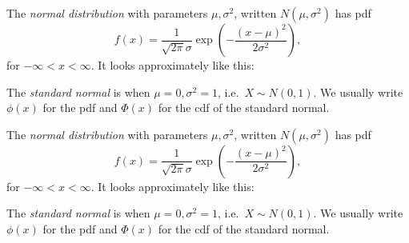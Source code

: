 \begin{note}
  \begin{field}
    \begin{defi}
      The \emph{normal distribution} with parameters $\mu, \sigma^2$, written $N(\mu, \sigma^2)$ has pdf
      \[
        f(x) = \frac{1}{\sqrt{2 \pi}\sigma}\exp\left(-\frac{(x - \mu)^2}{2\sigma^2}\right),
      \]
      for $-\infty < x < \infty$.
      It looks approximately like this:
      \begin{center}
      \end{center}
      The \emph{standard normal} is when $\mu = 0, \sigma^2 = 1$, i.e.\ $X\sim N(0, 1)$.
      We usually write $\phi(x)$ for the pdf and $\Phi(x)$ for the cdf of the standard normal.
    \end{defi}
  \end{field}
  \begin{field}
    \begin{defi}
      The \emph{normal distribution} with parameters $\mu, \sigma^2$, written $N(\mu, \sigma^2)$ has pdf
      \[
        f(x) = \frac{1}{\sqrt{2 \pi}\sigma}\exp\left(-\frac{(x - \mu)^2}{2\sigma^2}\right),
      \]
      for $-\infty < x < \infty$.
      It looks approximately like this:
      \begin{center}
      \end{center}
      The \emph{standard normal} is when $\mu = 0, \sigma^2 = 1$, i.e.\ $X\sim N(0, 1)$.
      We usually write $\phi(x)$ for the pdf and $\Phi(x)$ for the cdf of the standard normal.
    \end{defi}
  \end{field}
  \xplain{}%
\end{note}


